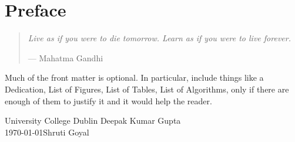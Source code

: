 %
%
%
%

\chapter*{Preface}


\begin{quote}
\noindent\textit{Live as if you were to die tomorrow. Learn as if you were to live forever.}

\hspace{2cm}--- Mahatma Gandhi
\end{quote}

Much of the front matter is optional. In particular, include things like a Dedication, List of Figures, List of Tables, List of Algorithms, only if there are enough of them to justify it and it would help the reader.


\vspace{2em}

University College Dublin \hfill Deepak Kumar Gupta \\
\today \hfill Shruti Goyal
